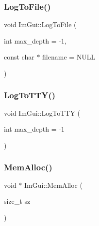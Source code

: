 \hypertarget{namespace_im_gui_ab62461a65c153b9f40842debef8aa755}{}\label{namespace_im_gui_ab62461a65c153b9f40842debef8aa755} 
\subsubsection{\texorpdfstring{Log\+To\+File()}{LogToFile()}}
{\footnotesize\ttfamily void Im\+Gui\+::\+Log\+To\+File (\begin{DoxyParamCaption}\item[{int}]{max\+\_\+depth = {\ttfamily -\/1},  }\item[{const char $\ast$}]{filename = {\ttfamily NULL} }\end{DoxyParamCaption})}

\hypertarget{namespace_im_gui_a37696f5296f33ae4218f53b40b81cccc}{}\label{namespace_im_gui_a37696f5296f33ae4218f53b40b81cccc} 
\subsubsection{\texorpdfstring{Log\+To\+T\+T\+Y()}{LogToTTY()}}
{\footnotesize\ttfamily void Im\+Gui\+::\+Log\+To\+T\+TY (\begin{DoxyParamCaption}\item[{int}]{max\+\_\+depth = {\ttfamily -\/1} }\end{DoxyParamCaption})}

\hypertarget{namespace_im_gui_a15efb2cac4a54b35489c5984ba1b661a}{}\label{namespace_im_gui_a15efb2cac4a54b35489c5984ba1b661a} 
\subsubsection{\texorpdfstring{Mem\+Alloc()}{MemAlloc()}}
{\footnotesize\ttfamily void $\ast$ Im\+Gui\+::\+Mem\+Alloc (\begin{DoxyParamCaption}\item[{size\+\_\+t}]{sz }\end{DoxyParamCaption})}

\hypertarget{namespace_im_gui_a269ec695c6e722ec3da85dae37f0675d}{}\label{namespace_im_gui_a269ec695c6e722ec3da85dae37f0675d} 
